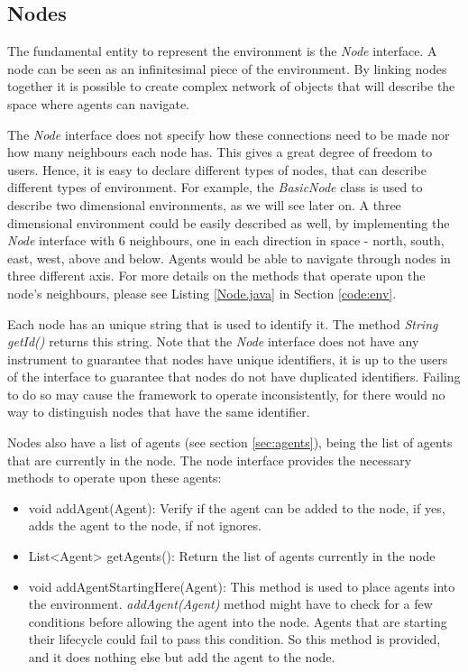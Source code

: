 \subsection{Nodes}

The fundamental entity to represent the environment is the \emph{Node} interface. A node can be seen as an infinitesimal piece of the environment. By linking nodes together it is possible to create complex network of objects that will describe the space where agents can navigate.

The \emph{Node} interface does not specify how these connections need to be made nor how many neighbours each node has. This gives a great degree of freedom to users. Hence, it is easy to declare different types of nodes, that can describe different types of environment. For example, the \emph{BasicNode} class is used to describe two dimensional environments, as we will see later on. A three dimensional environment could be easily described as well, by implementing the \emph{Node} interface with 6 neighbours, one in each direction in space - north, south, east, west, above and below. Agents would be able to navigate through nodes in three different axis. For more details on the methods that operate upon the node's neighbours, please see Listing \ref{Node.java} in Section \ref{code:env}.

Each node has an unique string that is used to identify it. The method \emph{String getId()} returns this string. Note that the \emph{Node} interface does not have any instrument to guarantee that nodes have unique identifiers, it is up to the users of the interface to guarantee that nodes do not have duplicated identifiers. Failing to do so may cause the framework to operate inconsistently, for there would no way to distinguish nodes that have the same identifier. 

Nodes also have a list of agents (see section \ref{sec:agents}), being the list of agents that are currently in the node. The node interface provides the necessary methods to operate upon these agents:

\begin{itemize}
  \item void addAgent(Agent): Verify if the agent can be added to the node, if yes, adds the agent to the node, if not ignores.
  \item List<Agent> getAgents(): Return the list of agents currently in the node
  \item void addAgentStartingHere(Agent): This method is used to place agents into the environment. \emph{addAgent(Agent)} method might have to check for a few conditions before allowing the agent into the node. Agents that are starting their lifecycle could fail to pass this condition. So this method is provided, and it does nothing else but add the agent to the node.
\end{itemize}

